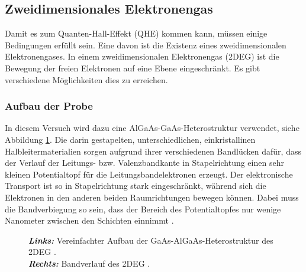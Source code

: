 
\subsection{Zweidimensionales Elektronengas}

Damit es zum Quanten-Hall-Effekt (QHE) kommen kann, müssen einige Bedingungen erfüllt sein. Eine davon ist die Existenz eines zweidimensionalen Elektronengases.
In einem zweidimensionalen Elektronengas (2DEG) ist die Bewegung der freien Elektronen auf eine Ebene eingeschränkt. Es gibt verschiedene Möglichkeiten dies zu erreichen. 
\subsubsection{Aufbau der Probe}
In diesem Versuch wird dazu eine AlGaAs-GaAs-Heterostruktur verwendet, siehe Abbildung \ref{fig:Proben_Aufbau}. Die darin gestapelten, unterschiedlichen, einkristallinen Halbleitermaterialien sorgen aufgrund ihrer verschiedenen Bandlücken dafür, dass der Verlauf der Leitungs- bzw. Valenzbandkante in Stapelrichtung einen sehr kleinen Potentialtopf für die Leitungsbandelektronen erzeugt. Der elektronische Transport ist so in Stapelrichtung stark eingeschränkt, während sich die Elektronen in den anderen beiden Raumrichtungen bewegen können. Dabei muss die Bandverbiegung so sein, dass der Bereich des Potentialtopfes nur wenige Nanometer zwischen den Schichten einnimmt  \cite[Kap.8 a]{weisbuch_quantum_1991}.


\begin{figure}[h]
	\centering
	\caption[2DEG Schicht]{
		\textit{\textbf{Links:}} Vereinfachter Aufbau der GaAs-AlGaAs-Heterostruktur des 2DEG \cite{anleitung}.\\
		\textit{\textbf{Rechts:}} Bandverlauf des 2DEG \cite{anleitung}.
	}
	\label{fig:Proben_Aufbau}
\end{figure}

